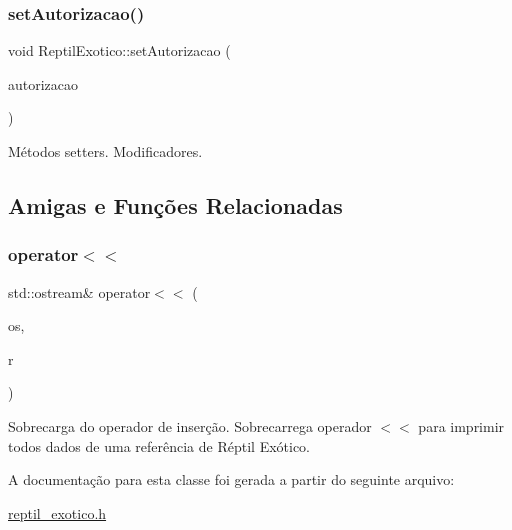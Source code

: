 \subsubsection{\texorpdfstring{set\+Autorizacao()}{setAutorizacao()}}
{\footnotesize\ttfamily void Reptil\+Exotico\+::set\+Autorizacao (\begin{DoxyParamCaption}\item[{std\+::string}]{autorizacao }\end{DoxyParamCaption})}

Métodos setters. Modificadores. 

\subsection{Amigas e Funções Relacionadas}
\mbox{\label{classReptilExotico_a1ddae6ad589e0969d123b6cbe3f70a67}} 
\subsubsection{\texorpdfstring{operator$<$$<$}{operator<<}}
{\footnotesize\ttfamily std\+::ostream\& operator$<$$<$ (\begin{DoxyParamCaption}\item[{std\+::ostream \&}]{os,  }\item[{\hyperlink{classReptilExotico}{Reptil\+Exotico} \&}]{r }\end{DoxyParamCaption})\hspace{0.3cm}{\ttfamily [friend]}}

Sobrecarga do operador de inserção. Sobrecarrega operador $<$$<$ para imprimir todos dados de uma referência de Réptil Exótico. 

A documentação para esta classe foi gerada a partir do seguinte arquivo\+:\begin{DoxyCompactItemize}
\item 
\hyperlink{reptil__exotico_8h}{reptil\+\_\+exotico.\+h}\end{DoxyCompactItemize}

